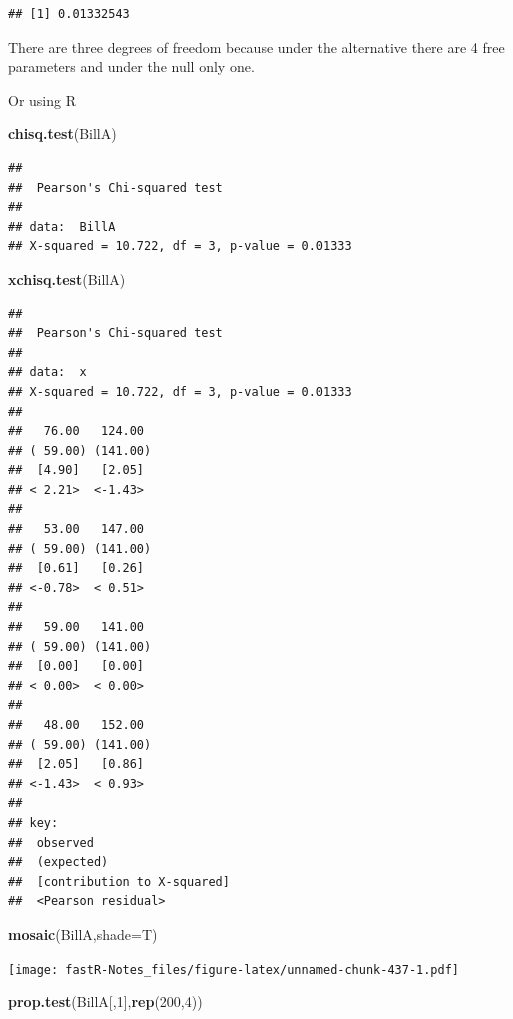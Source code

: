 \documentclass[]{book}
\newenvironment{Shaded}{\begin{snugshade}}{\end{snugshade}}
\newcommand{\KeywordTok}[1]{\textcolor[rgb]{0.13,0.29,0.53}{\textbf{#1}}}
\newcommand{\DataTypeTok}[1]{\textcolor[rgb]{0.13,0.29,0.53}{#1}}
\newcommand{\DecValTok}[1]{\textcolor[rgb]{0.00,0.00,0.81}{#1}}
\newcommand{\NormalTok}[1]{#1}
\theoremstyle{definition}
\theoremstyle{definition}
\theoremstyle{definition}
\theoremstyle{remark}
\begin{document}
\begin{verbatim}
## [1] 0.01332543
\end{verbatim}

There are three degrees of freedom because under the alternative there
are 4 free parameters and under the null only one.

Or using R

\begin{Shaded}
\begin{Highlighting}[]
\KeywordTok{chisq.test}\NormalTok{(BillA)}
\end{Highlighting}
\end{Shaded}

\begin{verbatim}
## 
##  Pearson's Chi-squared test
## 
## data:  BillA
## X-squared = 10.722, df = 3, p-value = 0.01333
\end{verbatim}

\begin{Shaded}
\begin{Highlighting}[]
\KeywordTok{xchisq.test}\NormalTok{(BillA)}
\end{Highlighting}
\end{Shaded}

\begin{verbatim}
## 
##  Pearson's Chi-squared test
## 
## data:  x
## X-squared = 10.722, df = 3, p-value = 0.01333
## 
##   76.00   124.00 
## ( 59.00) (141.00)
##  [4.90]   [2.05] 
## < 2.21>  <-1.43> 
##    
##   53.00   147.00 
## ( 59.00) (141.00)
##  [0.61]   [0.26] 
## <-0.78>  < 0.51> 
##    
##   59.00   141.00 
## ( 59.00) (141.00)
##  [0.00]   [0.00] 
## < 0.00>  < 0.00> 
##    
##   48.00   152.00 
## ( 59.00) (141.00)
##  [2.05]   [0.86] 
## <-1.43>  < 0.93> 
##    
## key:
##  observed
##  (expected)
##  [contribution to X-squared]
##  <Pearson residual>
\end{verbatim}

\begin{Shaded}
\begin{Highlighting}[]
\KeywordTok{mosaic}\NormalTok{(BillA,}\DataTypeTok{shade=}\NormalTok{T)}
\end{Highlighting}
\end{Shaded}

\texttt{[image: fastR-Notes\_files/figure-latex/unnamed-chunk-437-1.pdf]}

\begin{Shaded}
\begin{Highlighting}[]
\KeywordTok{prop.test}\NormalTok{(BillA[,}\DecValTok{1}\NormalTok{],}\KeywordTok{rep}\NormalTok{(}\DecValTok{200}\NormalTok{,}\DecValTok{4}\NormalTok{))}
\end{Highlighting}
\end{Shaded}
\end{document}
